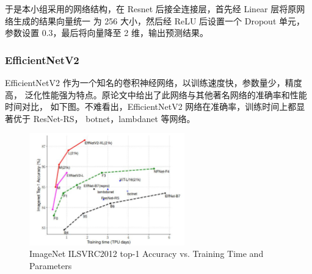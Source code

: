 \documentclass[UTF8,12pt,a4paper]{ctexart}
\begin{document}
于是本小组采用的网络结构，在 Resnet 后接全连接层，首先经 Linear 层将原网络生成的结果向量统一
为 256 大小，然后经 ReLU 后设置一个 Dropout 单元，参数设置 0.3，最后将向量降至 2 维，输出预测结果。

\subsubsection{EfficientNetV2}
EfficientNetV2 作为一个知名的卷积神经网络，以训练速度快，参数量少，精度高，
泛化性能强为特点。原论文中给出了此网络与其他著名网络的准确率和性能时间对比，
如下图。不难看出，EfficientNetV2 网络在准确率，训练时间上都显著优于 ResNet-RS，
botnet，lambdanet 等网络。
\begin{figure}[H]
	\centering
	\includegraphics[width=0.6\textwidth]{picture/efficientnet.png}
	\caption{ImageNet ILSVRC2012 top-1 Accuracy vs. Training Time and Parameters}
\end{figure}
\end{document}
